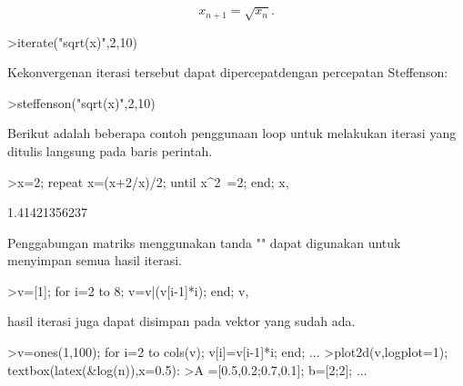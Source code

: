 \documentclass[a4paper,10pt]{article}
\begin{document}
\begin{eulernotebook}
\begin{eulercomment}
\begin{eulercomment}
\begin{eulercomment}
\begin{eulercomment}
\begin{eulercomment}
\end{eulercomment}
\begin{eulerformula}
\[
x_{n+1} = \sqrt{x_n}.
\]
\end{eulerformula}
\begin{eulerprompt}
>iterate("sqrt(x)",2,10)
\end{eulerprompt}
\begin{euleroutput}
  [2,  1.41421,  1.18921,  1.09051,  1.04427,  1.0219,  1.01089,
  1.00543,  1.00271,  1.00135,  1.00068]
\end{euleroutput}
\begin{eulercomment}
Kekonvergenan iterasi tersebut dapat dipercepatdengan percepatan Steffenson:
\end{eulercomment}
\begin{eulerprompt}
>steffenson("sqrt(x)",2,10)
\end{eulerprompt}
\begin{euleroutput}
  [1.04888,  1.00028,  1,  1]
\end{euleroutput}
\begin{eulercomment}
Berikut adalah beberapa contoh penggunaan loop untuk melakukan iterasi yang ditulis langsung
pada baris perintah.
\end{eulercomment}
\begin{eulerprompt}
>x=2; repeat x=(x+2/x)/2; until x^2~=2; end; x,
\end{eulerprompt}
\begin{euleroutput}
  1.41421356237
\end{euleroutput}
\begin{eulercomment}
Penggabungan matriks menggunakan tanda "\textbar{}" dapat digunakan untuk menyimpan semua hasil
iterasi.
\end{eulercomment}
\begin{eulerprompt}
>v=[1]; for i=2 to 8; v=v|(v[i-1]*i); end; v,
\end{eulerprompt}
\begin{euleroutput}
  [1,  2,  6,  24,  120,  720,  5040,  40320]
\end{euleroutput}
\begin{eulercomment}
hasil iterasi juga dapat disimpan pada vektor yang sudah ada.
\end{eulercomment}
\begin{eulerprompt}
>v=ones(1,100); for i=2 to cols(v); v[i]=v[i-1]*i; end; ...
>plot2d(v,logplot=1); textbox(latex(&log(n)),x=0.5):
>A =[0.5,0.2;0.7,0.1]; b=[2;2]; ...

\end{eulerprompt}
\end{eulercomment}
\end{eulercomment}
\end{eulercomment}
\end{eulercomment}
\end{eulernotebook}
\end{document}
